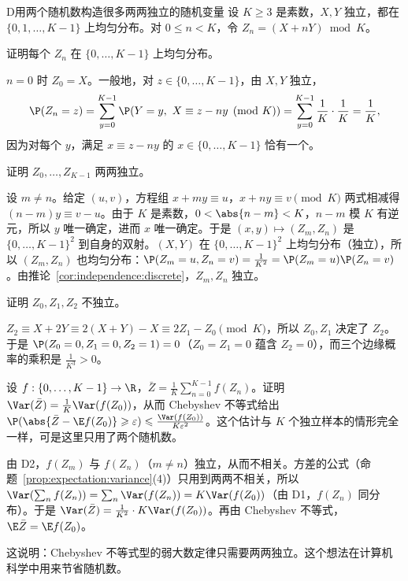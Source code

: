 \thinkingpart

\begin{probleme}[问题]{D}{用两个随机数构造很多两两独立的随机变量}
设 $K\geqslant3$ 是素数，$X,Y$ 独立，都在 $\{0,1,\dots,K-1\}$ 上均匀分布。对 $0\leqslant n<K$，令 $Z_n=(X+nY)\bmod K$。
\begin{questions}
\item 证明每个 $Z_n$ 在 $\{0,\dots,K-1\}$ 上均匀分布。
\begin{solution}
$n=0$ 时 $Z_0=X$。一般地，对 $z\in\{0,\dots,K-1\}$，由 $X,Y$ 独立，
\[
\P(Z_n=z)=\sum_{y=0}^{K-1}\P(Y=y,\ X\equiv z-ny\pmod K)=\sum_{y=0}^{K-1}\frac1K\cdot\frac1K=\frac1K,
\]
因为对每个 $y$，满足 $x\equiv z-ny$ 的 $x\in\{0,\dots,K-1\}$ 恰有一个。
\end{solution}

\item 证明 $Z_0,\dots,Z_{K-1}$ 两两独立。
\begin{solution}
设 $m\neq n$。给定 $(u,v)$，方程组 $x+my\equiv u$，$x+ny\equiv v\pmod K$ 两式相减得 $(n-m)y\equiv v-u$。由于 $K$ 是素数，$0<\abs{n-m}<K$，$n-m$ 模 $K$ 有逆元，所以 $y$ 唯一确定，进而 $x$ 唯一确定。于是 $(x,y)\mapsto(Z_m,Z_n)$ 是 $\{0,\dots,K-1\}^2$ 到自身的双射。$(X,Y)$ 在 $\{0,\dots,K-1\}^2$ 上均匀分布（独立），所以 $(Z_m,Z_n)$ 也均匀分布：$\P(Z_m=u,Z_n=v)=\frac1{K^2}=\P(Z_m=u)\P(Z_n=v)$。由推论~\ref{cor:independence:discrete}，$Z_m,Z_n$ 独立。
\end{solution}

\item 证明 $Z_0,Z_1,Z_2$ 不独立。
\begin{solution}
$Z_2\equiv X+2Y\equiv2(X+Y)-X\equiv2Z_1-Z_0\pmod K$，所以 $Z_0,Z_1$ 决定了 $Z_2$。于是 $\P(Z_0=0,Z_1=0,Z_2=1)=0$（$Z_0=Z_1=0$ 蕴含 $Z_2=0$），而三个边缘概率的乘积是 $\frac1{K^3}>0$。
\end{solution}

\item 设 $f:\{0,\dots,K-1\}\to\R$，$\bar Z=\frac1K\sum_{n=0}^{K-1}f(Z_n)$。证明 $\Var(\bar Z)=\frac1K\Var(f(Z_0))$，从而 Chebyshev 不等式给出 $\P(\abs{\bar Z-\E f(Z_0)}\geqslant\varepsilon)\leqslant\frac{\Var(f(Z_0))}{K\varepsilon^2}$。这个估计与 $K$ 个独立样本的情形完全一样，可是这里只用了两个随机数。
\begin{solution}
由 D2，$f(Z_m)$ 与 $f(Z_n)$（$m\neq n$）独立，从而不相关。方差的公式（命题~\ref{prop:expectation:variance}(4)）只用到两两不相关，所以 $\Var(\sum_nf(Z_n))=\sum_n\Var(f(Z_n))=K\Var(f(Z_0))$（由 D1，$f(Z_n)$ 同分布）。于是 $\Var(\bar Z)=\frac1{K^2}\cdot K\Var(f(Z_0))$。再由 Chebyshev 不等式，$\E\bar Z=\E f(Z_0)$。

这说明：Chebyshev 不等式型的弱大数定律只需要两两独立。这个想法在计算机科学中用来节省随机数。
\end{solution}
\end{questions}
\end{probleme}

